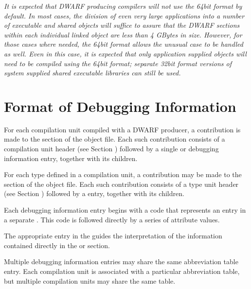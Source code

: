 \textit{It is expected that DWARF producing compilers will not use
the 64\dash bit format by default. In most cases, the division of
even very large applications into a number of executable and
shared objects will suffice to assure that the DWARF sections
within each individual linked object are less than 4 GBytes
in size. However, for those cases where needed, the 64\dash bit
format allows the unusual case to be handled as well. Even
in this case, it is expected that only application supplied
objects will need to be compiled using the 64\dash bit format;
separate 32\dash bit format versions of system supplied shared
executable libraries can still be used.}



\section{Format of Debugging Information}
\label{datarep:formatofdebugginginformation}

For each compilation unit compiled with a DWARF producer,
a contribution is made to the  section of
the object file. Each such contribution consists of a
compilation unit header 
(see Section ) 
followed by a
single  or  debugging
information entry, together with its children.

For each type defined in a compilation unit, a contribution may
be made to the  
section of the object file. Each
such contribution consists of a type unit header 
(see Section ) 
followed by a  entry, together with
its children.

Each debugging information entry begins with a code that
represents an entry in a separate 
. This
code is followed directly by a series of attribute values.

The appropriate entry in the 
 guides the
interpretation of the information contained directly in the
 or 
 section.

Multiple debugging information entries may share the same
abbreviation table entry. Each compilation unit is associated
with a particular abbreviation table, but multiple compilation
units may share the same table.
